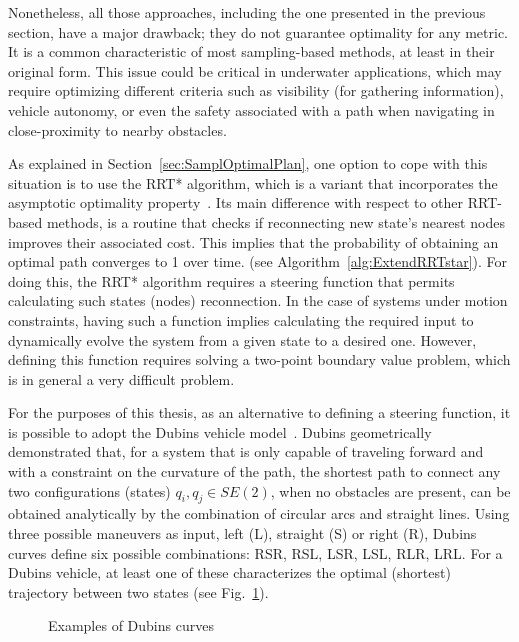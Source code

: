 Nonetheless, all those approaches, including the one presented in the previous
section, have a major drawback; they do not guarantee optimality for any metric.
It is a common characteristic of most sampling-based methods, at least in their
original form. This issue could be critical in underwater applications, which
may require optimizing different criteria such as visibility (for gathering
information), vehicle autonomy, or even the safety associated with a path when
navigating in close-proximity to nearby obstacles.

As explained in Section~\ref{sec:SamplOptimalPlan}, one option to cope with this
situation is to use the \ac{RRT*} algorithm, which is a variant that
incorporates the asymptotic optimality property~\cite{Karaman2011}.
Its main difference with respect to other \ac{RRT}-based methods, is a routine
that checks if reconnecting new state's nearest nodes improves their associated
cost. This implies that the probability of obtaining an optimal path converges
to 1 over time. (see Algorithm~\ref{alg:ExtendRRTstar}). For doing this, the
\ac{RRT*} algorithm requires a steering function that permits calculating such
states (nodes) reconnection. In the case of systems under motion constraints,
having such a function implies calculating the required input to dynamically
evolve the system from a given state to a desired one. However, defining this
function requires solving a two-point boundary value problem, which is in
general a very difficult problem.

For the purposes of this thesis, as an alternative to defining a steering
function, it is possible to adopt the Dubins vehicle model~\cite{Dubins1957}.
Dubins geometrically demonstrated that, for a system that is only capable of
traveling forward and with a constraint on the curvature of the path, the
shortest path to connect any two configurations (states) $q_i,q_j \in SE(2)$,
when no obstacles are present, can be obtained analytically by the combination
of circular arcs and straight lines. Using three possible maneuvers as input,
left (L), straight (S) or right (R), Dubins curves define six possible
combinations: RSR, RSL, LSR, LSL, RLR, LRL. For a Dubins vehicle, at least one
of these characterizes the optimal (shortest) trajectory between two states (see
Fig.~\ref{fig:DubinsPathsExample}).

\begin{figure}[htbp]
    \myfloatalign
     \quad
\caption[Examples of Dubins curves.]
{Examples of Dubins curves}
\label{fig:DubinsPathsExample}
\end{figure}


